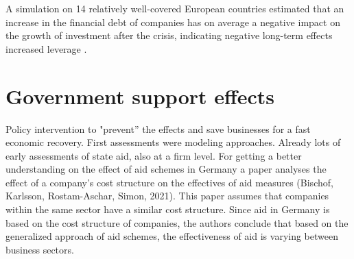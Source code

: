 A simulation on 14 relatively well-covered European countries estimated that an increase in the financial debt of companies has on average a negative impact on the growth of investment after the crisis, indicating negative long-term effects increased leverage \parencite{demmou_insolvency_2021}.




\section{Government support effects}

Policy intervention to "prevent” the effects and save businesses for a fast economic recovery.
First assessments were modeling approaches.
Already lots of early assessments of state aid, also at a firm level.
For getting a better understanding on the effect of aid schemes in Germany a paper analyses the effect of a company’s cost structure on the effectives of aid measures (Bischof, Karlsson, Rostam-Aschar, Simon, 2021). 
This paper assumes that companies within the same sector have a similar cost structure. 
Since aid in Germany is based on the cost structure of companies, the authors conclude that based on the generalized approach of aid schemes, the effectiveness of aid is varying between business sectors.